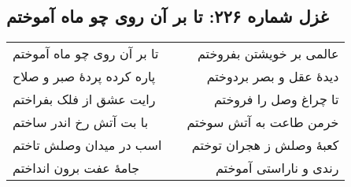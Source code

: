 \begin{center}
\section*{غزل شماره ۲۲۶: تا بر آن روی چو ماه آموختم}
\label{sec:226}
\begin{longtable}{l p{0.5cm} r}
تا بر آن روی چو ماه آموختم
&&
عالمی بر خویشتن بفروختم
\\
پاره کرده پردهٔ صبر و صلاح
&&
دیدهٔ عقل و بصر بردوختم
\\
رایت عشق از فلک بفراختم
&&
تا چراغ وصل را فروختم
\\
با بت آتش رخ اندر ساختم
&&
خرمن طاعت به آتش سوختم
\\
اسب در میدان وصلش تاختم
&&
کعبهٔ وصلش ز هجران توختم
\\
جامهٔ عفت برون انداختم
&&
رندی و ناراستی آموختم
\\
\end{longtable}
\end{center}
